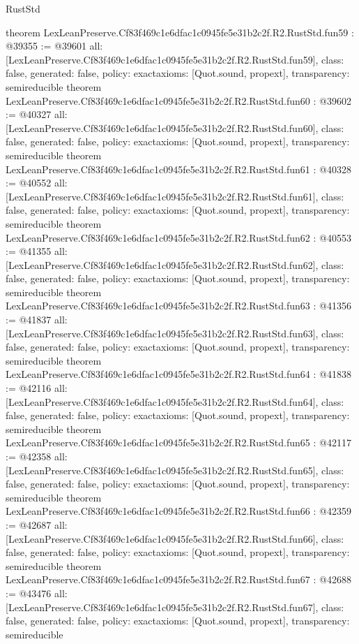 \begin{lexlean}{RustStd}
\begin{coremodule}
{}
theorem LexLeanPreserve.Cf83f469c1e6dfac1c0945fe5e31b2c2f.R2.RustStd.fun59 : @39355 := @39601 {
  all: [LexLeanPreserve.Cf83f469c1e6dfac1c0945fe5e31b2c2f.R2.RustStd.fun59],
  class: false,
  generated: false,
  policy: exact{axioms: [Quot.sound, propext]},
  transparency: semireducible
}
theorem LexLeanPreserve.Cf83f469c1e6dfac1c0945fe5e31b2c2f.R2.RustStd.fun60 : @39602 := @40327 {
  all: [LexLeanPreserve.Cf83f469c1e6dfac1c0945fe5e31b2c2f.R2.RustStd.fun60],
  class: false,
  generated: false,
  policy: exact{axioms: [Quot.sound, propext]},
  transparency: semireducible
}
theorem LexLeanPreserve.Cf83f469c1e6dfac1c0945fe5e31b2c2f.R2.RustStd.fun61 : @40328 := @40552 {
  all: [LexLeanPreserve.Cf83f469c1e6dfac1c0945fe5e31b2c2f.R2.RustStd.fun61],
  class: false,
  generated: false,
  policy: exact{axioms: [Quot.sound, propext]},
  transparency: semireducible
}
theorem LexLeanPreserve.Cf83f469c1e6dfac1c0945fe5e31b2c2f.R2.RustStd.fun62 : @40553 := @41355 {
  all: [LexLeanPreserve.Cf83f469c1e6dfac1c0945fe5e31b2c2f.R2.RustStd.fun62],
  class: false,
  generated: false,
  policy: exact{axioms: [Quot.sound, propext]},
  transparency: semireducible
}
theorem LexLeanPreserve.Cf83f469c1e6dfac1c0945fe5e31b2c2f.R2.RustStd.fun63 : @41356 := @41837 {
  all: [LexLeanPreserve.Cf83f469c1e6dfac1c0945fe5e31b2c2f.R2.RustStd.fun63],
  class: false,
  generated: false,
  policy: exact{axioms: [Quot.sound, propext]},
  transparency: semireducible
}
theorem LexLeanPreserve.Cf83f469c1e6dfac1c0945fe5e31b2c2f.R2.RustStd.fun64 : @41838 := @42116 {
  all: [LexLeanPreserve.Cf83f469c1e6dfac1c0945fe5e31b2c2f.R2.RustStd.fun64],
  class: false,
  generated: false,
  policy: exact{axioms: [Quot.sound, propext]},
  transparency: semireducible
}
theorem LexLeanPreserve.Cf83f469c1e6dfac1c0945fe5e31b2c2f.R2.RustStd.fun65 : @42117 := @42358 {
  all: [LexLeanPreserve.Cf83f469c1e6dfac1c0945fe5e31b2c2f.R2.RustStd.fun65],
  class: false,
  generated: false,
  policy: exact{axioms: [Quot.sound, propext]},
  transparency: semireducible
}
theorem LexLeanPreserve.Cf83f469c1e6dfac1c0945fe5e31b2c2f.R2.RustStd.fun66 : @42359 := @42687 {
  all: [LexLeanPreserve.Cf83f469c1e6dfac1c0945fe5e31b2c2f.R2.RustStd.fun66],
  class: false,
  generated: false,
  policy: exact{axioms: [Quot.sound, propext]},
  transparency: semireducible
}
theorem LexLeanPreserve.Cf83f469c1e6dfac1c0945fe5e31b2c2f.R2.RustStd.fun67 : @42688 := @43476 {
  all: [LexLeanPreserve.Cf83f469c1e6dfac1c0945fe5e31b2c2f.R2.RustStd.fun67],
  class: false,
  generated: false,
  policy: exact{axioms: [Quot.sound, propext]},
  transparency: semireducible
}
\end{coremodule}
\end{lexlean}
